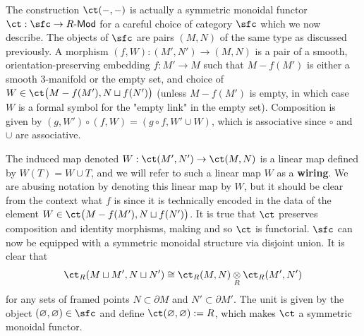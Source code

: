 The construction $\ct( -, -)$ is actually a symmetric monoidal functor $\ct: \sfc \to R\textsf{-Mod}$ for a careful choice of category $\sfc$ which we now describe. The objects of $\sfc$ are pairs $(M, N)$ of the same type as discussed previously. A morphism $(f, W): (M', N') \to (M, N)$ is a pair of a smooth, orientation-preserving embedding $f: M' \to M$ such that $M - f(M')$ is either a smooth 3-manifold or the empty set, and choice of $W \in \ct\big( M-f(M'), N \sqcup f(N') \big)$ (unless $M - f(M')$ is empty, in which case $W$ is a formal symbol for the "empty link" in the empty set). Composition is given by $(g, W') \circ (f, W) = (g \circ f, W' \cup W)$, which is associative since $\circ$ and $\cup$ are associative.


The induced map denoted $W: \ct(M', N') \to \ct(M, N)$ is a linear map defined by $W(T) = W \cup T$, and we will refer to such a linear map $W$ as a \textbf{wiring}. We are abusing notation by denoting this linear map by $W$, but it should be clear from the context what $f$ is since it is technically encoded in the data of the element $W \in \ct\big( M-f(M'), N \sqcup f(N') \big)$. It is true that $\ct$ preserves composition and identity morphisms, making and so $\ct$ is functorial. $\sfc$ can now be equipped with a symmetric monoidal structure via disjoint union. It is clear that 
\[\ct_R(M \sqcup M', N \sqcup N') \cong \ct_R(M, N) \underset{R}{\otimes} \ct_R(M', N')\]
for any sets of framed points $N \subset \partial M$ and $N' \subset \partial M'$. The unit is given by the object $(\varnothing, \varnothing) \in \sfc$ and define $\ct(\varnothing, \varnothing) := R$, which makes $\ct$ a symmetric monoidal functor. 

